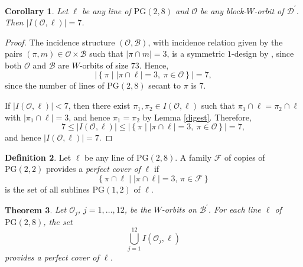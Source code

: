 \documentclass[a4paper, 11pt]{article}
\newtheorem{theorem}{Theorem}[section]
\newtheorem{corollary}[theorem]{Corollary}
\theoremstyle{definition}
\newtheorem{definition}[theorem]{Definition}
\theoremstyle{definition}
\theoremstyle{definition}
\numberwithin{equation}{section}
\begin{document}
 

\begin{corollary}
	\label{CorJedan}Let $\ell $ be any line of $\mathrm{PG}(2,8)$ and $\mathcal{O}$ be
	any block-$W$-orbit of $\mathcal{D}^{\prime }$. Then $\lvert I(\mathcal{O},\ell )\rvert =7$.
\end{corollary}

\begin{proof}
	The incidence structure $(\mathcal{O}, \mathcal{B})$, with incidence relation given by the pairs $(\pi, m) \in \mathcal{O} \times \mathcal{B}$ such that $\lvert \pi \cap m \rvert = 3$, is a symmetric $1$-design by \cite[1.2.6]{Demb}, since both $\mathcal{O}$ and $\mathcal{B}$ are $W$-orbits of size $73$. Hence,
	\[
	\left\lvert \left\{ \pi \mid \lvert \pi \cap \ell \rvert = 3, \ \pi \in \mathcal{O} \right\} \right\rvert = 7,
	\]
	since the number of lines of $\mathrm{PG}(2,8)$ secant to $\pi$ is $7$. 
	
	If $\lvert I(\mathcal{O}, \ell) \rvert < 7$, then there exist $\pi_{1}, \pi_{2} \in I(\mathcal{O}, \ell)$ such that $\pi_{1} \cap \ell = \pi_{2} \cap \ell$ with $\lvert \pi_{1} \cap \ell \rvert = 3$, and hence $\pi_{1} = \pi_{2}$ by Lemma \ref{digest}. Therefore,
	\[
	7 \leq \lvert I(\mathcal{O}, \ell) \rvert \leq \left\lvert \left\{ \pi \mid \lvert \pi \cap \ell \rvert = 3, \ \pi \in \mathcal{O} \right\} \right\rvert = 7,
	\]
	and hence $\lvert I(\mathcal{O}, \ell) \rvert = 7$.
\end{proof}



\begin{definition}
	Let $\ell$ be any line of $\mathrm{PG}(2,8)$. A family $\mathcal{F}$ of copies of $\mathrm{PG}(2,2)$ provides a \emph{perfect cover of} $\ell$ if 
	\[
	\left\{ \pi \cap \ell \mid \lvert \pi \cap \ell \rvert = 3, \, \pi \in \mathcal{F} \right\}
	\]
	is the set of all sublines $\mathrm{PG}(1,2)$ of $\ell$.
\end{definition}



\begin{theorem}
	\label{TeoJedan}Let $\mathcal{O}_{j}$, $j=1,\ldots,12$, be the $W$-orbits on $\mathcal{B}^{\prime }$. For each line $\ell $ of $\mathrm{PG}(2,8)$, the set  
	\[
	\bigcup_{j=1}^{12}I(\mathcal{O}_{j},\ell )
	\]%
	provides a perfect cover of $\ell $.
\end{theorem}
\end{document}
